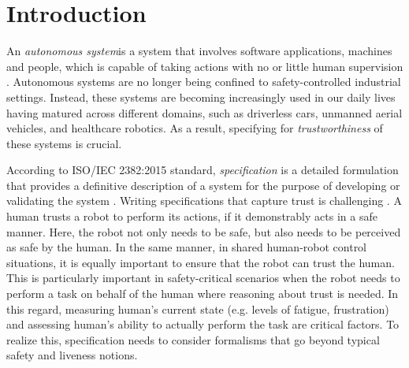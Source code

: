 \documentclass[sigconf]{acmart}
\begin{document}



\maketitle

\section{Introduction}
An \textit{autonomous system}is a system that involves software applications, machines and people, which is capable of taking actions with no or little human supervision \cite{TAS-Hub}. 
Autonomous systems are no longer being confined to safety-controlled industrial settings. 
Instead, these systems are becoming increasingly used in our daily lives having matured across different domains, such as driverless cars, unmanned aerial vehicles, and healthcare robotics. 
As a result, specifying for \textit{trustworthiness} of these systems is crucial. 

According to ISO/IEC 2382:2015 standard, \textit{specification} is a detailed formulation that provides a definitive description of a system for the purpose of developing or validating the system \cite{ISO2382}. 
Writing specifications that capture trust is challenging \cite{Kress-Gazit21}. 
A human trusts a robot to perform its actions, if it demonstrably acts in a safe manner. 
Here, the robot not only needs to be safe, but also needs to be perceived as safe by the human. 
In the same manner, in shared human-robot control situations, it is equally important to ensure that the robot can trust the human. 
This is particularly important in safety-critical scenarios when the robot needs to perform a task on behalf of the human where reasoning about trust is needed. 
In this regard, measuring human's current state (e.g. levels of fatigue, frustration) and assessing human's ability to actually perform the task are critical factors. 
To realize this, specification needs to consider formalisms that go beyond typical safety and liveness notions. 
\end{document}
